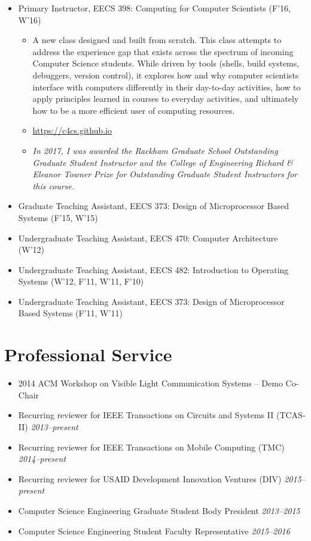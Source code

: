 \documentclass{article}
\begin{document}
\begin{itemize}

  \item[] Primary Instructor, EECS 398: Computing for Computer Scientists (F'16, W'16)
    \begin{itemize}
      \item[] A new class designed and built from scratch. This class attempts
        to address the experience gap that exists across the spectrum of
        incoming Computer Science students. While driven by tools (shells,
        build systems, debuggers, version control), it explores how and why
        computer scientists interface with computers differently in their
        day-to-day activities, how to apply principles learned in courses to
        everyday activities, and ultimately how to be a more efficient user of
        computing resources.
      \item[] \url{https://c4cs.github.io}
      \item[] \emph{In 2017, I was awarded the Rackham Graduate School Outstanding Graduate Student Instructor and the College of Engineering Richard \& Eleanor Towner Prize for Outstanding Graduate Student Instructors for this course.}
    \end{itemize}
  \item[] Graduate Teaching Assistant, EECS 373: Design of Microprocessor Based Systems (F'15, W'15)
  \item[] Undergraduate Teaching Assistant, EECS 470: Computer Architecture (W'12)
  \item[] Undergraduate Teaching Assistant, EECS 482: Introduction to Operating Systems (W'12, F'11, W'11, F'10)
  \item[] Undergraduate Teaching Assistant, EECS 373: Design of Microprocessor Based Systems (F'11, W'11)

\end{itemize}

\section*{Professional Service}

\begin{itemize}

  \item[] 2014 ACM Workshop on Visible Light Communication Systems -- Demo Co-Chair
  \item[] Recurring reviewer for IEEE Transactions on Circuits and Systems II (TCAS-II)
    \emph{2013--present}
  \item[] Recurring reviewer for IEEE Transactions on Mobile Computing (TMC)
    \emph{2014--present}
  \item[] Recurring reviewer for USAID Development Innovation Ventures (DIV)
    \emph{2015--present}
  \item[] Computer Science Engineering Graduate Student Body President
    \emph{2013--2015}
  \item[] Computer Science Engineering Student Faculty Representative
    \emph{2015--2016}

\end{itemize}
\end{document}
